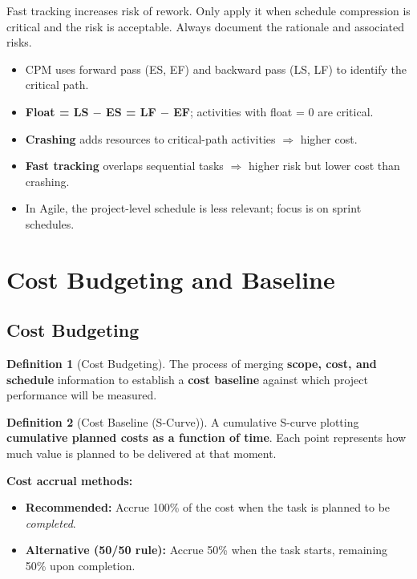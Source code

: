 \documentclass[11pt,a4paper]{article}
\theoremstyle{definition}
\newtheorem{definition}{Definition}[section]
\theoremstyle{plain}
\begin{document}
\begin{warning}
Fast tracking increases risk of rework. Only apply it when schedule compression is critical and the risk is acceptable. Always document the rationale and associated risks.
\end{warning}

\begin{keytakeaways}
\begin{itemize}[nosep]
  \item CPM uses forward pass (ES, EF) and backward pass (LS, LF) to identify the critical path.
  \item \textbf{Float = LS $-$ ES = LF $-$ EF}; activities with float = 0 are critical.
  \item \textbf{Crashing} adds resources to critical-path activities $\Rightarrow$ higher cost.
  \item \textbf{Fast tracking} overlaps sequential tasks $\Rightarrow$ higher risk but lower cost than crashing.
  \item In Agile, the project-level schedule is less relevant; focus is on sprint schedules.
\end{itemize}
\end{keytakeaways}


\section{Cost Budgeting and Baseline}

\subsection{Cost Budgeting}

\begin{definition}[Cost Budgeting]
The process of merging \textbf{scope, cost, and schedule} information to establish a \textbf{cost baseline} against which project performance will be measured.
\end{definition}

\begin{definition}[Cost Baseline (S-Curve)]
A cumulative S-curve plotting \textbf{cumulative planned costs as a function of time}. Each point represents how much value is planned to be delivered at that moment.

\textbf{Cost accrual methods:}
\begin{itemize}[nosep]
  \item \textbf{Recommended:} Accrue 100\% of the cost when the task is planned to be \emph{completed}.
  \item \textbf{Alternative (50/50 rule):} Accrue 50\% when the task starts, remaining 50\% upon completion.
\end{itemize}
\end{definition}
\end{document}
